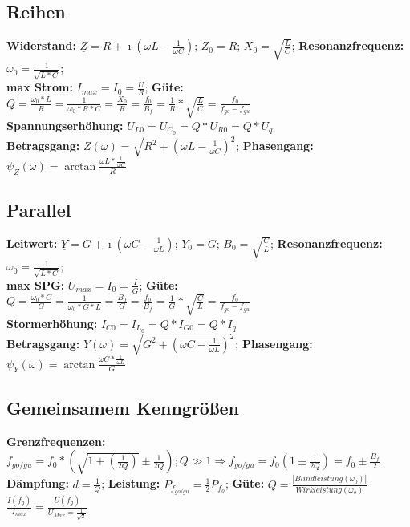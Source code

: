\documentclass[10pt,a5paper]{article}
\begin{document}
 \subsection{Reihen}
 \textbf{Widerstand:} \ensuremath{\underline{Z}=R+\imath(\omega L-\frac{1}{\omega C})}; \ensuremath{Z_0=R}; \ensuremath{X_0=\sqrt{\frac{L}{C}}}; \textbf{Resonanzfrequenz:} \ensuremath{\omega_0=\frac{1}{\sqrt{L*C}}};
 \\\textbf{max Strom:} \ensuremath{I_{max}=I_0=\frac{U}{R}}; \textbf{Güte:} \ensuremath{Q=\frac{\omega_0*L}{R}=\frac{1}{\omega_0*R*C}=\frac{X_0}{R}=\frac{f_0}{B_f}=\frac{1}{R}*\sqrt{\frac{L}{C}}=\frac{f_0}{f_{go}-f_{gu}}}
 \\\textbf{Spannungserhöhung:} \ensuremath{U_{L0}=U_{C_0}=Q*U_{R0}=Q*U_q }
 \\\textbf{Betragsgang:} \ensuremath{Z(\omega)=\sqrt{R^2+(\omega L - \frac{1}{\omega C})^2}}; \textbf{Phasengang:} \ensuremath{\psi_Z(\omega)=\arctan{\frac{\omega L*\frac{1}{\omega C}}{R}}}
 \subsection{Parallel}
  \textbf{Leitwert:} \ensuremath{\underline{Y}=G+\imath(\omega C-\frac{1}{\omega L})}; \ensuremath{Y_0=G}; \ensuremath{B_0=\sqrt{\frac{C}{L}}}; \textbf{Resonanzfrequenz:} \ensuremath{\omega_0=\frac{1}{\sqrt{L*C}}};
  \\\textbf{max SPG:} \ensuremath{U_{max}=I_0=\frac{I}{G}}; \textbf{Güte:} \ensuremath{Q=\frac{\omega_0*C}{G}=\frac{1}{\omega_0*G*L}=\frac{B_0}{G}=\frac{f_0}{B_f}=\frac{1}{G}*\sqrt{\frac{C}{L}}=\frac{f_0}{f_{go}-f_{gu}}}
  \\\textbf{Stormerhöhung:} \ensuremath{I_{C0}=I_{L_0}=Q*I_{G0}=Q*I_q }
  \\\textbf{Betragsgang:} \ensuremath{Y(\omega)=\sqrt{G^2+(\omega C - \frac{1}{\omega L})^2}}; \textbf{Phasengang:} \ensuremath{\psi_Y(\omega)=\arctan{\frac{\omega C*\frac{1}{\omega L}}{G}}}
  \subsection{Gemeinsamem Kenngrößen}
  \textbf{Grenzfrequenzen:} \ensuremath{f_{go/gu}=f_0*(\sqrt{1+(\frac{1}{2Q})}\pm \frac{1}{2Q}); Q\gg 1\Rightarrow f_{go/gu}=f_0(1\pm \frac{1}{2Q})=f_0\pm \frac{B_f}{2}}
  \\\textbf{Dämpfung:} \ensuremath{d=\frac{1}{Q}}; \textbf{Leistung:} \ensuremath{P_{f_{go/gu}}=\frac{1}{2}P_{f_o}}; \textbf{Güte:} \ensuremath{Q=\frac{|Blindleistung(\omega_0)|}{Wirkleistung(\omega_o)}}\\\ensuremath{\frac{I(f_g)}{I_{max}}=\frac{U(f_g)}{U_{Max}=\frac{1}{\sqrt{2}}}}
  
\end{document}
